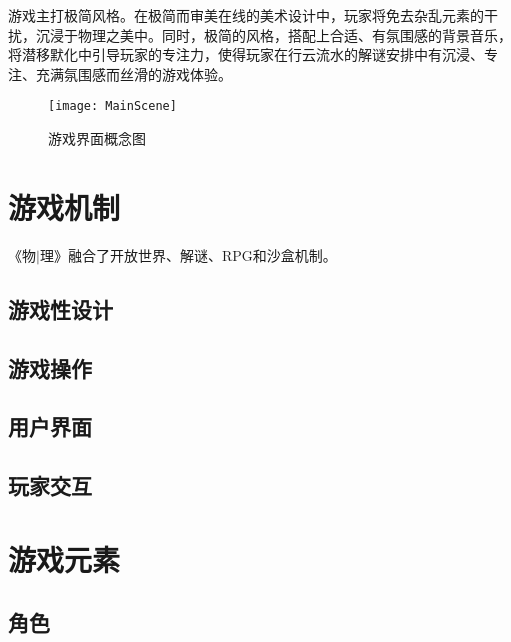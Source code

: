 \documentclass{tstextbook}
\begin{document}
游戏主打极简风格。在极简而审美在线的美术设计中，玩家将免去杂乱元素的干扰，沉浸于物理之美中。同时，极简的风格，搭配上合适、有氛围感的背景音乐，将潜移默化中引导玩家的专注力，使得玩家在行云流水的解谜安排中有沉浸、专注、充满氛围感而丝滑的游戏体验。

\begin{figure}[H]
\centering
\texttt{[image: MainScene]} 
\caption{游戏界面概念图}
\label{MainScene}
\end{figure}

\chapter{游戏机制}

\begin{summary}
《物$|$理》融合了开放世界、解谜、RPG和沙盒机制。
\end{summary}

\section{游戏性设计}


\section{游戏操作}


\section{用户界面}



\section{玩家交互}


\chapter{游戏元素}

\begin{summary}

\end{summary}

\section{角色}
\end{document}
